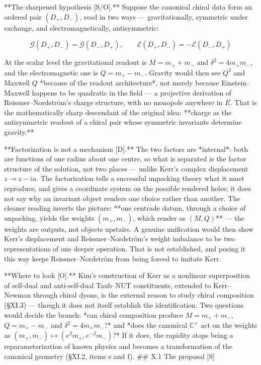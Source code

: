 **The sharpened hypothesis [S/O].** Suppose the canonical chiral data form an ordered pair $(D_+,D_-)$, read in two ways — gravitationally, symmetric under exchange, and electromagnetically, antisymmetric:

$$\mathcal G(D_+,D_-) = \mathcal G(D_-,D_+),\qquad \mathcal E(D_+,D_-) = -\mathcal E(D_-,D_+)$$

At the scalar level the gravitational readout is $M = m_++m_-$ and $\delta^2 = 4m_+m_-$, and the electromagnetic one is $Q = m_+-m_-$. Gravity would then see $Q^2$ and Maxwell $Q$ *because of the readout architecture*, not merely because Einstein–Maxwell happens to be quadratic in the field — a projective derivation of Reissner–Nordström's charge structure, with no monopole anywhere in $E$. That is the mathematically sharp descendant of the original idea: **charge as the antisymmetric readout of a chiral pair whose symmetric invariants determine gravity.**

**Factorization is not a mechanism [D].** The two factors are *internal*: both are functions of one radius about one centre, so what is separated is the factor structure of the solution, not two places — unlike Kerr's complex displacement $z\to z-ia$. The factorization tells a successful unpacking theory what it must reproduce, and gives a coordinate system on the possible rendered holes; it does not say why an invariant object renders one choice rather than another. The cleaner reading inverts the picture: **one centrade datum, through a choice of unpacking, yields the weights $(m_+,m_-)$, which render as $(M,Q)$** — the weights are outputs, not objects upstairs. A genuine unification would then show Kerr's displacement and Reissner–Nordström's weight imbalance to be two representations of one deeper operation. That is not established, and posing it this way keeps Reissner–Nordström from being forced to imitate Kerr.

**Where to look [O].** Kim's construction of Kerr as a nonlinear superposition of self-dual and anti-self-dual Taub–NUT constituents, extended to Kerr–Newman through chiral dyons, is the external reason to study chiral composition (§XI.3) — though it does not itself establish the identification. Two questions would decide the branch: *can chiral composition produce $M = m_++m_-$, $Q = m_+-m_-$ and $\delta^2 = 4m_+m_-$?* and *does the canonical $\mathbb{C}^\times$ act on the weights as $(m_+,m_-)\mapsto(e^\beta m_+,e^{-\beta}m_-)$?* If it does, the rapidity stops being a reparameterization of known physics and becomes a transformation of the canonical geometry (§XI.2, items e and f).
## X.1 The proposal [S]

